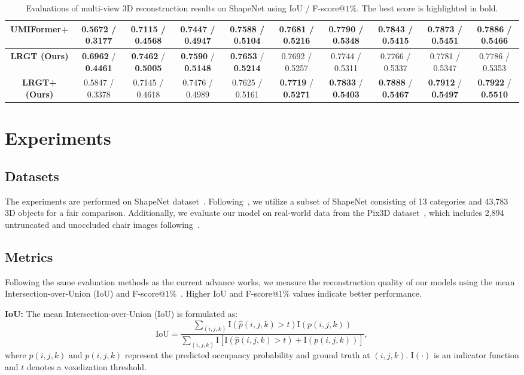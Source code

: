 \documentclass[10pt,twocolumn,letterpaper]{article}
\begin{document}
\begin{table*}[]
{\begin{tabular}{c|ccccccccc}
        \textbf{UMIFormer+} & 0.5672 / 0.3177 & 0.7115 / 0.4568 & 0.7447 / 0.4947 & 0.7588 / 0.5104 & 0.7681 / 0.5216 & 0.7790 / 0.5348 & 0.7843 / 0.5415 & 0.7873 / 0.5451 & 0.7886 / 0.5466 \\ \hline 
        \textbf{LRGT (Ours)} & \textbf{0.6962} / \textbf{0.4461} & \textbf{0.7462} / \textbf{0.5005} & \textbf{0.7590} / \textbf{0.5148} & \textbf{0.7653} / \textbf{0.5214} & 0.7692 / 0.5257 & 0.7744 / 0.5311 & 0.7766 / 0.5337 & 0.7781 / 0.5347 & 0.7786 / 0.5353 \\
        \textbf{LRGT+ (Ours)} & 0.5847 / 0.3378 & 0.7145 / 0.4618 & 0.7476 / 0.4989 & 0.7625 / 0.5161 & \textbf{0.7719} / \textbf{0.5271} & \textbf{0.7833} / \textbf{0.5403} & \textbf{0.7888} / \textbf{0.5467} & \textbf{0.7912} / \textbf{0.5497} & \textbf{0.7922} / \textbf{0.5510} \\ \hline
	\end{tabular}}
	\caption{Evaluations of multi-view 3D reconstruction results on ShapeNet using IoU / F-score$@1\%$. The best score is highlighted in bold.}
\label{total_result}
\end{table*}

\section{Experiments}
\subsection{Datasets}
The experiments are performed on ShapeNet dataset~\cite{chang2015shapenet}. Following~\cite{choy20163d}, we utilize a subset of ShapeNet consisting of 13 categories and 43,783 3D objects for a fair comparison. Additionally, we evaluate our model on real-world data from the Pix3D dataset~\cite{sun2018pix3d}, which includes 2,894 untruncated and unoccluded chair images following~\cite{xie2019pix2vox,xie2020pix2vox++}.

\subsection{Metrics} Following the same evaluation methods as the current advance works, we measure the reconstruction quality of our models using the mean Intersection-over-Union (IoU) and F-score$@1\%$~\cite{xie2020pix2vox++}. Higher IoU and F-score$@1\%$ values indicate better performance.

\textbf{IoU:} The mean Intersection-over-Union (IoU) is formulated as:
\begin{equation}
	\text{IoU}=\frac{\sum_{(i,j,k)}\text{I}(\hat{p}(i,j,k)>t)\text{I}(p(i,j,k))}{\sum_{(i,j,k)}\text{I}[\text{I}(\hat{p}(i,j,k)>t)+\text{I}(p(i,j,k))]}, \label{iou}
\end{equation}
where $\hat{p}(i,j,k)$ and $p(i,j,k)$ represent the predicted occupancy probability and ground truth at $(i,j,k)$. $\text{I}(\cdot)$ is an indicator function and $t$ denotes a voxelization threshold.
\end{document}
